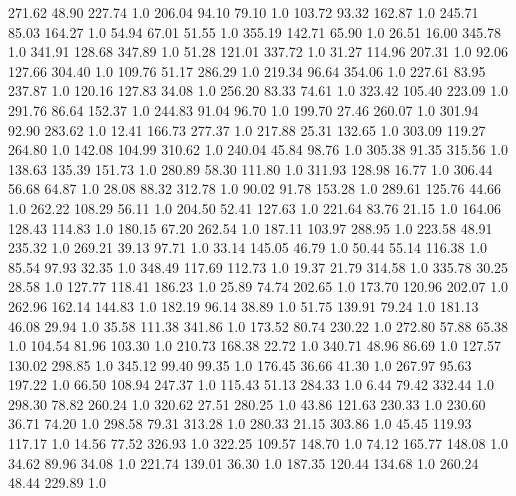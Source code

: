   271.62    48.90   227.74  1.0
  206.04    94.10    79.10  1.0
  103.72    93.32   162.87  1.0
  245.71    85.03   164.27  1.0
   54.94    67.01    51.55  1.0
  355.19   142.71    65.90  1.0
   26.51    16.00   345.78  1.0
  341.91   128.68   347.89  1.0
   51.28   121.01   337.72  1.0
   31.27   114.96   207.31  1.0
   92.06   127.66   304.40  1.0
  109.76    51.17   286.29  1.0
  219.34    96.64   354.06  1.0
  227.61    83.95   237.87  1.0
  120.16   127.83    34.08  1.0
  256.20    83.33    74.61  1.0
  323.42   105.40   223.09  1.0
  291.76    86.64   152.37  1.0
  244.83    91.04    96.70  1.0
  199.70    27.46   260.07  1.0
  301.94    92.90   283.62  1.0
   12.41   166.73   277.37  1.0
  217.88    25.31   132.65  1.0
  303.09   119.27   264.80  1.0
  142.08   104.99   310.62  1.0
  240.04    45.84    98.76  1.0
  305.38    91.35   315.56  1.0
  138.63   135.39   151.73  1.0
  280.89    58.30   111.80  1.0
  311.93   128.98    16.77  1.0
  306.44    56.68    64.87  1.0
   28.08    88.32   312.78  1.0
   90.02    91.78   153.28  1.0
  289.61   125.76    44.66  1.0
  262.22   108.29    56.11  1.0
  204.50    52.41   127.63  1.0
  221.64    83.76    21.15  1.0
  164.06   128.43   114.83  1.0
  180.15    67.20   262.54  1.0
  187.11   103.97   288.95  1.0
  223.58    48.91   235.32  1.0
  269.21    39.13    97.71  1.0
   33.14   145.05    46.79  1.0
   50.44    55.14   116.38  1.0
   85.54    97.93    32.35  1.0
  348.49   117.69   112.73  1.0
   19.37    21.79   314.58  1.0
  335.78    30.25    28.58  1.0
  127.77   118.41   186.23  1.0
   25.89    74.74   202.65  1.0
  173.70   120.96   202.07  1.0
  262.96   162.14   144.83  1.0
  182.19    96.14    38.89  1.0
   51.75   139.91    79.24  1.0
  181.13    46.08    29.94  1.0
   35.58   111.38   341.86  1.0
  173.52    80.74   230.22  1.0
  272.80    57.88    65.38  1.0
  104.54    81.96   103.30  1.0
  210.73   168.38    22.72  1.0
  340.71    48.96    86.69  1.0
  127.57   130.02   298.85  1.0
  345.12    99.40    99.35  1.0
  176.45    36.66    41.30  1.0
  267.97    95.63   197.22  1.0
   66.50   108.94   247.37  1.0
  115.43    51.13   284.33  1.0
    6.44    79.42   332.44  1.0
  298.30    78.82   260.24  1.0
  320.62    27.51   280.25  1.0
   43.86   121.63   230.33  1.0
  230.60    36.71    74.20  1.0
  298.58    79.31   313.28  1.0
  280.33    21.15   303.86  1.0
   45.45   119.93   117.17  1.0
   14.56    77.52   326.93  1.0
  322.25   109.57   148.70  1.0
   74.12   165.77   148.08  1.0
   34.62    89.96    34.08  1.0
  221.74   139.01    36.30  1.0
  187.35   120.44   134.68  1.0
  260.24    48.44   229.89  1.0
